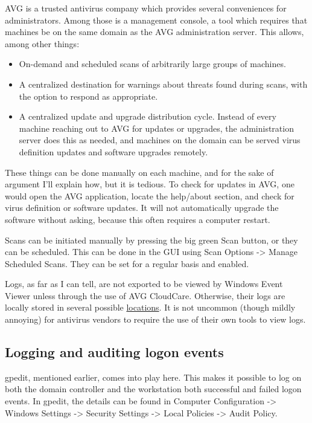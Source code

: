 AVG is a trusted antivirus company which provides several conveniences
for administrators. Among those is a management console, a tool which
requires that machines be on the same domain as the AVG administration
server. This allows, among other things:

\begin{itemize}
\item
  On-demand and scheduled scans of arbitrarily large groups of machines.
\item
  A centralized destination for warnings about threats found during
  scans, with the option to respond as appropriate.
\item
  A centralized update and upgrade distribution cycle. Instead of every
  machine reaching out to AVG for updates or upgrades, the
  administration server does this as needed, and machines on the domain
  can be served virus definition updates and software upgrades remotely.
\end{itemize}

These things can be done manually on each machine, and for the sake of
argument I'll explain how, but it is tedious. To check for updates in
AVG, one would open the AVG application, locate the help/about section,
and check for virus definition or software updates. It will not
automatically upgrade the software without asking, because this often
requires a computer restart.

Scans can be initiated manually by pressing the big green Scan button,
or they can be scheduled. This can be done in the GUI using Scan Options
-\textgreater{} Manage Scheduled Scans. They can be set for a regular
basis and enabled.

Logs, as far as I can tell, are not exported to be viewed by Windows
Event Viewer unless through the use of AVG CloudCare. Otherwise, their
logs are locally stored in several possible
\href{https://support.avg.com/SupportArticleView?l=en\&urlname=Log-File-Locations-for-AVG-Products}{locations}.
It is not uncommon (though mildly annoying) for antivirus vendors to
require the use of their own tools to view logs.

\hypertarget{logging-and-auditing-logon-events}{%
\subsection{Logging and auditing logon
events}\label{logging-and-auditing-logon-events}}

gpedit, mentioned earlier, comes into play here. This makes it possible
to log on both the domain controller and the workstation both successful
and failed logon events. In gpedit, the details can be found in Computer
Configuration -\textgreater{} Windows Settings -\textgreater{} Security
Settings -\textgreater{} Local Policies -\textgreater{} Audit Policy.

